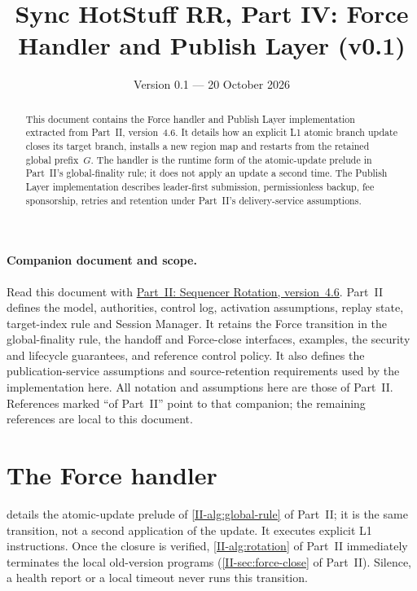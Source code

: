 \documentclass[11pt,a4paper]{article}
\title{Sync HotStuff RR, Part IV: Force Handler and Publish Layer (v0.1)}
\author{}\date{Version 0.1 --- 20 October 2026}
\begin{document}
\maketitle
\begin{abstract}
This document contains the Force handler and Publish Layer implementation
extracted from Part~II, version~4.6. It details how an explicit L1 atomic branch update closes
its target branch, installs a new region map and restarts from the
retained global prefix~$G$. The handler is the runtime form of the
atomic-update prelude in Part~II's global-finality rule; it does not
apply an update a second time. The Publish Layer implementation describes
leader-first submission, permissionless backup, fee sponsorship, retries
and retention under Part~II's delivery-service assumptions.
\end{abstract}

\paragraph{Companion document and scope.}
Read this document with
\href{sync_hotstuff_rr_part2_rotation_v4_6.pdf}{Part~II: Sequencer Rotation,
version~4.6}. Part~II defines the model, authorities, control log,
activation assumptions, replay state, target-index rule and Session
Manager. It retains the Force transition in the global-finality rule,
the handoff and Force-close interfaces, examples, the security and
lifecycle guarantees, and reference control policy. It also defines the
publication-service assumptions and source-retention requirements used
by the implementation here. All notation and assumptions here are those
of Part~II. References marked ``of Part~II'' point to that companion;
the remaining references are local to this document.

\section{The Force handler}
\label{sec:force}
 details the atomic-update prelude of
\cref{II-alg:global-rule} of Part~II; it is the same transition, not a second
application of the update. It executes explicit L1 instructions.
Once the closure is verified, \cref{II-alg:rotation} of Part~II immediately terminates
the local old-version programs (\cref{II-sec:force-close} of Part~II). Silence, a
health report or a local timeout never runs this transition.
\end{document}
